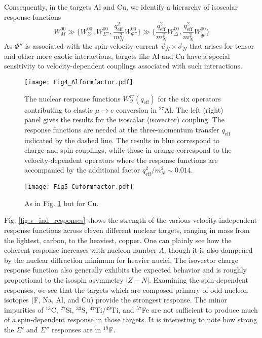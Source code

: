\documentclass{book}[12pt]
\begin{document}
Consequently, in the targets Al and Cu, we identify a hierarchy of isoscalar response functions
\begin{equation}
W_M^{00}\gg \bigg\{W^{00}_{\Sigma'},W_{\Sigma''}^{00},\frac{q_\mathrm{eff}^2}{m_N^2}W^{00}_{\Phi''}\bigg\}\gg\bigg\{\frac{q_\mathrm{eff}^2}{m_N^2}W^{00}_{\Delta},\frac{q^2_\mathrm{eff}}{m_N^2}W_{\tilde{\Phi}'}^{00}\bigg\}
\end{equation}
As $\Phi''$ is associated with the spin-velocity current $\vec{v}_N\times\vec{\sigma}_N$ that arises for tensor and other more exotic interactions, targets like Al and Cu have a special sensitivity to velocity-dependent couplings associated with such interactions. 
\begin{figure}
\centering
\texttt{[image: Fig4\_Alformfactor.pdf]}
\caption{The nuclear response functions $W^{\tau\tau}_\mathcal{O}(q_\mathrm{eff})$ for the six operators contributing to elastic $\mu\rightarrow e$ conversion in $^{27}$Al. The left (right) panel gives the results for the isoscalar (isovector) coupling. The response functions are needed at the three-momentum transfer $q_\mathrm{eff}$ indicated by the dashed line. The results in blue correspond to charge and spin couplings, while those in orange correspond to the velocity-dependent operators where the response functions are accompanied by the additional factor $q^2_\mathrm{eff}/m_N^2\sim 0.014$.}
\label{fig:Al_responses}
\end{figure}
\begin{figure}
\centering
\texttt{[image: Fig5\_Cuformfactor.pdf]}
\caption{As in Fig. \ref{fig:Al_responses} but for Cu.}
\label{fig:Cu_responses}
\end{figure}

Fig. \ref{fig:v_ind_responses} shows the strength of the various velocity-independent response functions across eleven different nuclear targets, ranging in mass from the lightest, carbon, to the heaviest, copper. One can plainly see how the coherent response increases with nucleon number $A$, though it is also dampened by the nuclear diffraction minimum for heavier nuclei. The isovector charge response function also generally exhibits the expected behavior and is roughly proportional to the isospin asymmetry $|Z-N|$. Examining the spin-dependent responses, we see that the targets which are composed primary of odd-nucleon isotopes (F, Na, Al, and Cu) provide the strongest response. The minor impurities of $^{13}$C, $^{27}$Si, $^{33}$S, $^{47}$Ti/$^{49}$Ti, and $^{57}$Fe are not sufficient to produce much of a spin-dependent response in those targets. It is interesting to note how strong the $\Sigma'$ and $\Sigma''$ responses are in $^{19}$F.
\end{document}
